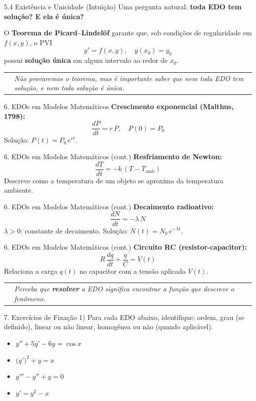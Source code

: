 \documentclass[11pt, aspectratio=169]{beamer}
\makeatletter
\newcommand{\notebox}[1]{%
  \begin{center}
  \begin{tabular}{@{}l@{\hspace{0.35cm}}p{0.82\textwidth}@{}}
    \textcolor{accent}{\rule{2pt}{0.55cm}} & \itshape\small\color{white!88!black} #1
  \end{tabular}
  \end{center}%
}
\makeatother
\begin{document}
\begin{frame}{5.4 Existência e Unicidade (Intuição)}
Uma pergunta natural: \textbf{toda EDO tem solução? E ela é única?}

O \textbf{Teorema de Picard--Lindelöf} garante que, sob condições de regularidade em $f(x,y)$, o PVI
\[
y' = f(x,y), \quad y(x_0) = y_0
\]
possui \textbf{solução única} em algum intervalo ao redor de $x_0$.

\notebox{Não provaremos o teorema, mas é importante saber que nem toda EDO tem solução, e nem toda solução é única.}
\end{frame}

\begin{frame}{6. EDOs em Modelos Matemáticos}
\textbf{Crescimento exponencial (Malthus, 1798):}
\[
\frac{dP}{dt} = r\,P, \quad P(0) = P_0
\]
Solução: $P(t) = P_0\,e^{rt}$.
\end{frame}

\begin{frame}{6. EDOs em Modelos Matemáticos (cont.)}
\textbf{Resfriamento de Newton:}
\[
\frac{dT}{dt} = -k\,(T - T_{\text{amb}})
\]
Descreve como a temperatura de um objeto se aproxima da temperatura ambiente.
\end{frame}

\begin{frame}{6. EDOs em Modelos Matemáticos (cont.)}
\textbf{Decaimento radioativo:}
\[
\frac{dN}{dt} = -\lambda\,N
\]
$\lambda > 0$: constante de decaimento. Solução: $N(t) = N_0\,e^{-\lambda t}$.
\end{frame}

\begin{frame}{6. EDOs em Modelos Matemáticos (cont.)}
\textbf{Circuito RC (resistor-capacitor):}
\[
R\,\frac{dq}{dt} + \frac{q}{C} = V(t)
\]
Relaciona a carga $q(t)$ no capacitor com a tensão aplicada $V(t)$.

\notebox{Perceba que \textbf{resolver} a EDO significa encontrar a função que descreve o fenômeno.}
\end{frame}

\begin{frame}{7. Exercícios de Fixação}
1) Para cada EDO abaixo, identifique: ordem, grau (se definido), linear ou não linear, homogênea ou não (quando aplicável).
\begin{itemize}
  \item[a)] $y'' + 5y' - 6y = \cos x$
  \item[b)] $\bigl(y'\bigr)^2 + y = x$
  \item[c)] $y''' - y'' + y = 0$
  \item[d)] $y' = y^2 - x$
\end{itemize}
\end{frame}
\end{document}

